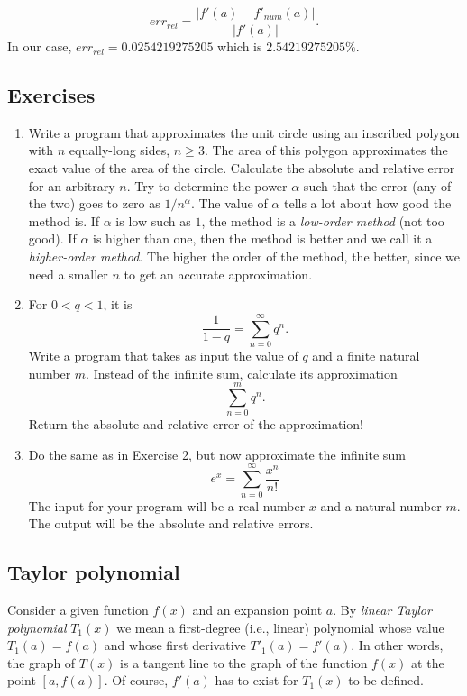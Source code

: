 \documentclass[article,A4,12pt]{llncs}
\begin{document}
$$
err_{rel} = \frac{|f'(a) - f'_{num}(a)|}{|f'(a)|}.
$$
In our case, $err_{rel} = 0.0254219275205$ which is $2.54219275205 \%$.

\subsection{Exercises}

\begin{enumerate}
\item Write a program that approximates the unit circle using an inscribed polygon 
      with $n$ equally-long sides, $n \ge 3$. The area of this polygon approximates the exact
      value of the area of the circle. Calculate the absolute and 
      relative error for an arbitrary $n$. Try to determine the power $\alpha$
      such that the error (any of the two) goes to zero as $1/n^{\alpha}$. The value 
      of $\alpha$ tells a lot about how good the method is. If $\alpha$ is low such 
      as $1$, the method is a {\em low-order method} (not too good). If $\alpha$ is
      higher than one, then the method is better and we call it a {\em higher-order method}.
      The higher the order of the method, the better, since we need a smaller $n$ to
      get an accurate approximation.
\item For $0 < q < 1$, it is 
      $$
      \frac{1}{1-q} = \sum_{n=0}^{\infty} q^n. 
      $$
      Write a program that takes as input the value of $q$ and a finite natural number 
      $m$. Instead of the infinite sum, calculate its approximation 
      $$
      \sum_{n=0}^{m} q^n. 
      $$ 
      Return the absolute and relative error of the approximation!
\item Do the same as in Exercise 2, but now approximate the infinite sum
      $$
      e^x = \sum_{n=0}^{\infty} \frac{x^n}{n!}
      $$
      The input for your program will be a real number $x$ and a natural number $m$.
      The output will be the absolute and relative errors.
\end{enumerate}


\subsection{Taylor polynomial}

Consider a given function $f(x)$ and an expansion point $a$. By {\em linear Taylor polynomial} $T_1(x)$ 
we mean a first-degree (i.e., linear) polynomial whose value $T_1(a) = f(a)$ and whose first derivative 
$T'_1(a) = f'(a)$. In other words, the graph of $T(x)$ is a tangent line to the graph of the function 
$f(x)$ at the point $[a, f(a)]$.
Of course, $f'(a)$ has to exist for $T_1(x)$ to be defined. 
\end{document}
